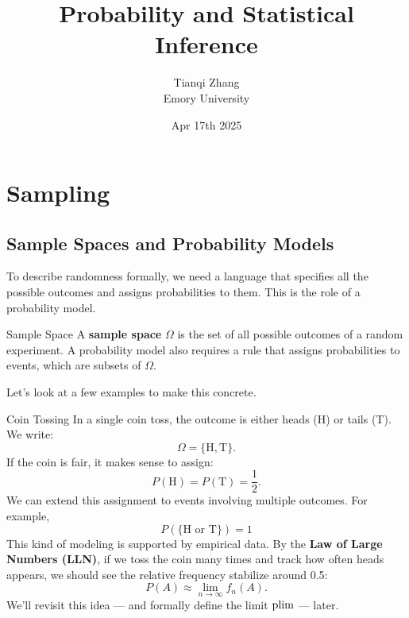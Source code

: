 

\title{\textbf{%
               Probability and Statistical Inference}}
\author{Tianqi Zhang\\
Emory University}
\date{Apr 17th 2025}



\newpage
\maketitle
\setcounter{tocdepth}{1} %

\setcounter{section}{1}
\section{Sampling}
\subsection{Sample Spaces and Probability Models}

To describe randomness formally, we need a language that specifies all the possible outcomes and assigns probabilities to them. This is the role of a probability model. \\

\begin{df}{Sample Space}
A \textbf{sample space} $\Omega$ is the set of all possible outcomes of a random experiment. A probability model also requires a rule that assigns probabilities to events, which are subsets of $\Omega$.
\end{df}

Let’s look at a few examples to make this concrete.

\begin{eg}{Coin Tossing}
In a single coin toss, the outcome is either heads (H) or tails (T). We write:
\[
\Omega = \{\text{H}, \text{T}\}.
\]
If the coin is fair, it makes sense to assign:
\[
P(\text{H}) = P(\text{T}) = \frac{1}{2}.
\]
We can extend this assignment to events involving multiple outcomes. For example, $$P(\{\text{H or T}\}) = 1$$
This kind of modeling is supported by empirical data. By the \textbf{Law of Large Numbers (LLN)}, if we toss the coin many times and track how often heads appears, we should see the relative frequency stabilize around 0.5:
\[
P(A) \approx \lim_{n \to \infty} f_n(A).
\]
We’ll revisit this idea — and formally define the limit $\operatorname*{plim}$ — later.
\end{eg}


